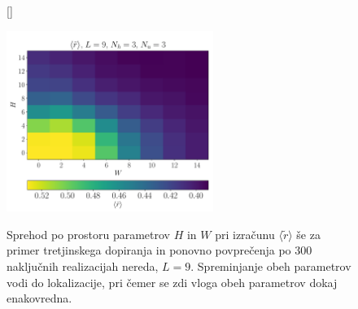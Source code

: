 \documentclass[10pt,a4paper]{article}
\begin{document}
\begin{figure}[H]
[\FBwidth]
{\caption{Sprehod po prostoru parametrov $H$ in $W$ pri izračunu $\langle \tilde{r}\rangle$ še za primer tretjinskega dopiranja in ponovno povprečenja po 300 naključnih realizacijah nereda, $L=9$. Spreminjanje obeh parametrov vodi do lokalizacije, pri čemer se zdi vloga obeh parametrov dokaj enakovredna. }\label{fig:r_density_9_3_3}}
{\includegraphics[width=0.6\textwidth]{r_density_9_3_3.pdf}}
\end{figure}
\end{document}
